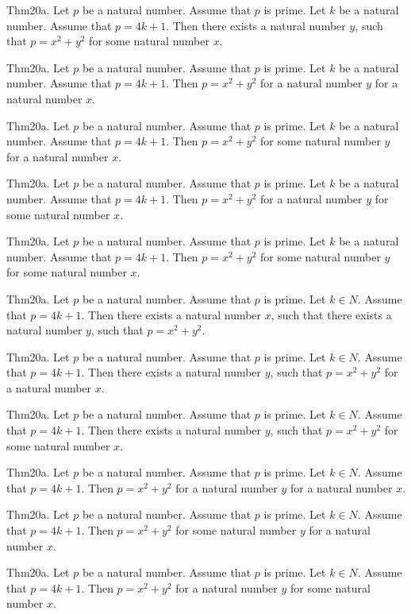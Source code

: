 \documentclass{article}
\begin{document}
Thm20a. Let $p$ be a natural number. Assume that $p$ is prime. Let $k$ be a natural number. Assume that $p = 4 k + 1$. Then there exists a natural number $y$, such that $p = x ^{ 2}+ y ^{ 2}$ for some natural number $x$.

Thm20a. Let $p$ be a natural number. Assume that $p$ is prime. Let $k$ be a natural number. Assume that $p = 4 k + 1$. Then $p = x ^{ 2}+ y ^{ 2}$ for a natural number $y$ for a natural number $x$.

Thm20a. Let $p$ be a natural number. Assume that $p$ is prime. Let $k$ be a natural number. Assume that $p = 4 k + 1$. Then $p = x ^{ 2}+ y ^{ 2}$ for some natural number $y$ for a natural number $x$.

Thm20a. Let $p$ be a natural number. Assume that $p$ is prime. Let $k$ be a natural number. Assume that $p = 4 k + 1$. Then $p = x ^{ 2}+ y ^{ 2}$ for a natural number $y$ for some natural number $x$.

Thm20a. Let $p$ be a natural number. Assume that $p$ is prime. Let $k$ be a natural number. Assume that $p = 4 k + 1$. Then $p = x ^{ 2}+ y ^{ 2}$ for some natural number $y$ for some natural number $x$.

Thm20a. Let $p$ be a natural number. Assume that $p$ is prime. Let $k \in N$. Assume that $p = 4 k + 1$. Then there exists a natural number $x$, such that there exists a natural number $y$, such that $p = x ^{ 2}+ y ^{ 2}$.

Thm20a. Let $p$ be a natural number. Assume that $p$ is prime. Let $k \in N$. Assume that $p = 4 k + 1$. Then there exists a natural number $y$, such that $p = x ^{ 2}+ y ^{ 2}$ for a natural number $x$.

Thm20a. Let $p$ be a natural number. Assume that $p$ is prime. Let $k \in N$. Assume that $p = 4 k + 1$. Then there exists a natural number $y$, such that $p = x ^{ 2}+ y ^{ 2}$ for some natural number $x$.

Thm20a. Let $p$ be a natural number. Assume that $p$ is prime. Let $k \in N$. Assume that $p = 4 k + 1$. Then $p = x ^{ 2}+ y ^{ 2}$ for a natural number $y$ for a natural number $x$.

Thm20a. Let $p$ be a natural number. Assume that $p$ is prime. Let $k \in N$. Assume that $p = 4 k + 1$. Then $p = x ^{ 2}+ y ^{ 2}$ for some natural number $y$ for a natural number $x$.

Thm20a. Let $p$ be a natural number. Assume that $p$ is prime. Let $k \in N$. Assume that $p = 4 k + 1$. Then $p = x ^{ 2}+ y ^{ 2}$ for a natural number $y$ for some natural number $x$.
\end{document}

